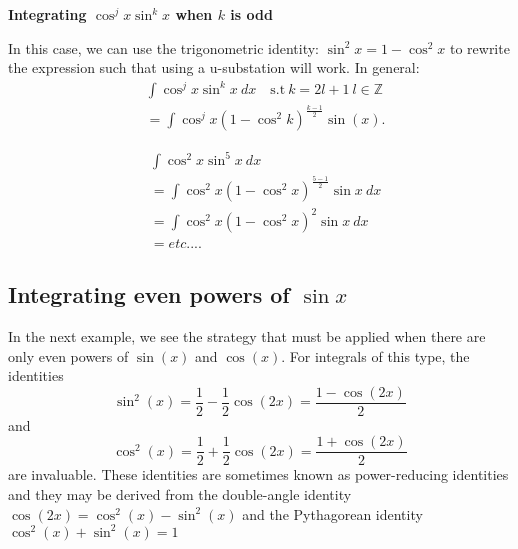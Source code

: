 \documentclass{report}
\begin{document}
        \bigbreak \noindent 
        \begin{large}
            \textbf{Integrating $\cos^{j}{x}\sin^{k}{x}$ when $k$ is odd}
        \end{large}
        \bigbreak \noindent 
        In this case, we can use the trigonometric identity: $\sin^{2}{x} = 1-\cos^{2}{x}$ to rewrite the expression such that using a u-substation will work. In general:
        \begin{align*}
            &\int \cos^{j}{x}\sin^{k}{x}\ dx\quad \text{s.t}\ k = 2l+1\ l \in \mathbb{Z} \\
            &=\int \cos^{j}{x}(1-\cos^{2}{k})^{\frac{k-1}{2}}\sin{(x)}
        .\end{align*}
        \bigbreak \noindent 
        \begin{eg}[Evaluate]
            \begin{align*}
                &\int \cos^{2}{x}\sin^{5}{x}\ dx \\
                &=\int\cos^{2}{x}(1-\cos^{2}{x})^{\frac{5-1}{2}}\sin{x}\ dx \\
                &=\int \cos^{2}{x}(1-\cos^{2}{x})^{2}\sin{x}\ dx \\
                &=etc...
            .\end{align*}
        \end{eg}
        \bigbreak \noindent 

        \pagebreak 
        \subsection*{Integrating even powers of $\sin{x}$}
        \bigbreak \noindent 
        In the next example, we see the strategy that must be applied when there are only even powers of \( \sin(x) \) and \( \cos(x) \). For integrals of this type, the identities
        \[
        \sin^2(x) = \frac{1}{2} - \frac{1}{2}\cos(2x) = \frac{1 - \cos(2x)}{2}
        \]
        and
        \[
        \cos^2(x) = \frac{1}{2} + \frac{1}{2}\cos(2x) = \frac{1 + \cos(2x)}{2}
        \]
        are invaluable. These identities are sometimes known as power-reducing identities and they may be derived from the double-angle identity  $\cos(2x) = \cos^2(x) - \sin^2(x)$ and the Pythagorean identity  $\cos^2(x) + \sin^2(x) = 1$
\end{document}
